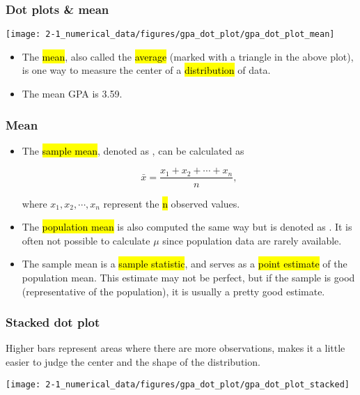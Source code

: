 

\begin{frame}
\frametitle{Dot plots \& mean}

\begin{center}
\texttt{[image: 2-1\_numerical\_data/figures/gpa\_dot\_plot/gpa\_dot\_plot\_mean]}
\end{center}

\begin{itemize}

\item The \hl{mean}, also called the \hl{average} (marked with a triangle in the above plot), is one way to measure the center of a \hl{distribution} of data.

\item The mean GPA is 3.59.

\end{itemize} 

\end{frame}


\begin{frame}
\frametitle{Mean}

\begin{itemize}

\item The \hl{sample mean}, denoted as , can be calculated as

\[ \bar{x} = \frac{x_1 + x_2 + \cdots + x_n}{n}, \]

where $x_1, x_2, \cdots, x_n$ represent the \hl{n} observed values.

\item The \hl{population mean} is also computed the same way but is denoted as \mathhl{\mu}. It is often not possible to calculate $\mu$ since population data are rarely available.

\item The sample mean is a \hl{sample statistic}, and serves as a \hl{point estimate} of the population mean. This estimate may not be perfect, but if the sample is good (representative of the population), it is usually a pretty good estimate. 

\end{itemize}

\end{frame}


\begin{frame}
\frametitle{Stacked dot plot}

Higher bars represent areas where there are more observations, makes it a little easier to judge the center and the shape of the distribution.

\begin{center}
\texttt{[image: 2-1\_numerical\_data/figures/gpa\_dot\_plot/gpa\_dot\_plot\_stacked]}
\end{center}

\end{frame}

